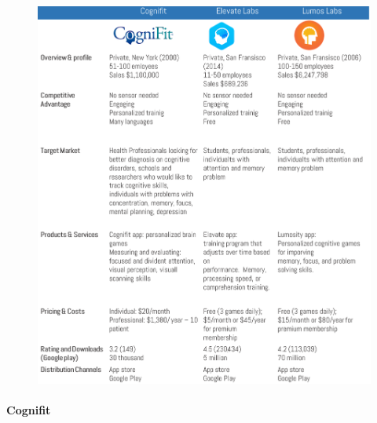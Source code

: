 \documentclass[letterpaper,10pt]{article}
\begin{document}
\begin{figure}[!htb]
\centering
\includegraphics[scale=0.5]{braingame_comp.PNG}
\label{img:braingames_tabla}
\end{figure}

\newpage

\paragraph{Cognifit}

\end{document}
